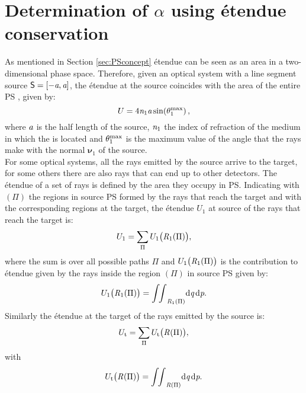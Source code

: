 \section{Determination of $\alpha$ using \'{e}tendue conservation}
As mentioned in Section \ref{sec:PSconcept} \'{e}tendue can be seen as an area in a two-dimensional phase space. 
Therefore, given an optical system with a line segment source $\textsf{S} = [-\textit{a}, \textit{a}]$, the \'{e}tendue at the source coincides with the area of the entire PS , given by:
\begin{equation}\label{eq:etenduesource}
U = 4\textit{n}_1 \textit{a} \sin(\theta_1^{\textrm{max}})\,,
\end{equation}
 where $\textit{a}$ is the half length of the source, $\textit{n}_1$ the index of refraction of the medium in which the  is located and $\theta_1^{\textrm{max}}$ is the maximum value of the angle that the rays make with the normal $\boldsymbol{\nu}_1$ of the source.\\ \indent 
For some optical systems, all the rays emitted by the source arrive to the target, for some others there are also rays that can end up to other detectors. 
The \'{e}tendue of a set of rays is defined by the area they occupy in PS. Indicating with $(\Pi)$ the regions in source PS formed by the rays that reach the target and with  the corresponding regions at the target, the \'{e}tendue $U_1$ at source of the rays that reach the target is:
\begin{equation}\label{eq:etenduesumsource}
U_1 = \sum_\Pi{U_1\big(\mbox{$\emph{R}_{\textit{$1$}}$}(\Pi)\big)},
\end{equation}
where the sum is over all possible paths $\Pi$ and $U_1\big(\mbox{$\emph{R}_{\textit{$1$}}$}(\Pi)\big)$ is the contribution to \'{e}tendue given by the rays inside the region 
$(\Pi)$ in source PS given by:
\begin{equation}\label{eq:etendueintegralsource}
U_1\big(\mbox{$\emph{R}_{\textit{$1$}}$}(\Pi)\big) = {\int\!\!\int}_{\emph{R}_1(\Pi)} \textrm{d}\textit{q}\,\textrm{d}\textit{p}.
\end{equation}
Similarly the \'{e}tendue at the target of the rays emitted by the source is:
\begin{equation}
U_\textrm{t}= \sum_\Pi{U_\textrm{t}\big(\mbox{$\emph{R}_{\textit{}}$}(\Pi)\big)},
\end{equation}
with
\begin{equation}\label{eq:etendueintegraltarget}
U_\textrm{t}\big(\mbox{$\emph{R}_{\textit{}}$}(\Pi)\big) = {\int\!\!\int}_{\emph{R}(\Pi)} \textrm{d}\textit{q}\,\textrm{d}\textit{p}.
\end{equation}
